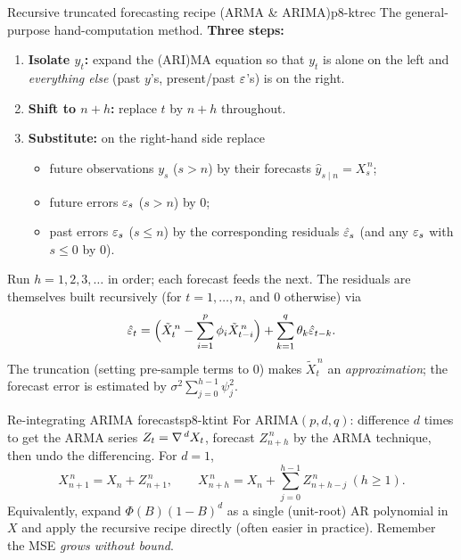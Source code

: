 \begin{keytech}{Recursive truncated forecasting recipe (ARMA \& ARIMA)}{p8-ktrec}
The general-purpose hand-computation method. \textbf{Three steps:}
\begin{enumerate}
  \item \textbf{Isolate $y_t$:} expand the (ARI)MA equation so that $y_t$ is
        alone on the left and \emph{everything else} (past $y$'s, present/past
        $\varepsilon$'s) is on the right.
  \item \textbf{Shift to $n+h$:} replace $t$ by $n+h$ throughout.
  \item \textbf{Substitute:} on the right-hand side replace
        \begin{itemize}
          \item future observations $y_{s}$ ($s>n$) by their forecasts
                $\hat y_{s\mid n}=X^{\,n}_s$;
          \item future errors $\varepsilon_s$ ($s>n$) by $0$;
          \item past errors $\varepsilon_s$ ($s\le n$) by the corresponding residuals
                $\hat{\varepsilon}_s$ (and any $\varepsilon_s$ with $s\le0$ by $0$).
        \end{itemize}
\end{enumerate}
Run $h=1,2,3,\dots$ in order; each forecast feeds the next. The residuals are
themselves built recursively (for $t=1,\dots,n$, and $0$ otherwise) via
\[
\hat{\varepsilon}_t=\Big(\tilde X^{\,n}_t-\sum_{i=1}^p\phi_i\tilde X^{\,n}_{t-i}\Big)
+\sum_{k=1}^q\theta_k\hat{\varepsilon}_{t-k}.
\]
The truncation (setting pre-sample terms to $0$) makes $\tilde X^{\,n}_t$ an
\emph{approximation}; the forecast error is estimated by
$\sigma^2\sum_{j=0}^{h-1}\psi_j^2$.
\end{keytech}

\begin{keytech}{Re-integrating ARIMA forecasts}{p8-ktint}
For ARIMA$(p,d,q)$: difference $d$ times to get the ARMA series
$Z_t=\nabla^{\,d}X_t$, forecast $Z^{\,n}_{n+h}$ by the ARMA technique, then undo
the differencing. For $d=1$,
\[
X^{\,n}_{n+1}=X_n+Z^{\,n}_{n+1},\qquad
X^{\,n}_{n+h}=X_n+\sum_{j=0}^{h-1}Z^{\,n}_{n+h-j}\ (h\ge1).
\]
Equivalently, expand $\Phi(B)(1-B)^d$ as a single (unit-root) AR polynomial in
$X$ and apply the recursive recipe directly (often easier in practice). Remember
the MSE \emph{grows without bound}.
\end{keytech}

